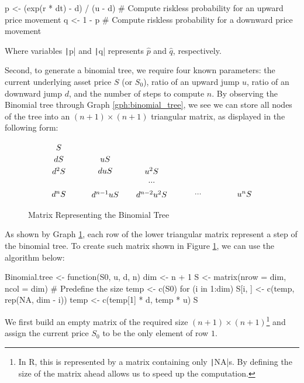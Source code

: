 \begin{Rminted}
p <- (exp(r * dt) - d) / (u - d) # Compute riskless probability for an upward price movement
q <- 1 - p # Compute riskless probability for a downward price movement
\end{Rminted}

Where variables \texttt|p| and \texttt|q| represents $\hat{p}$ and $\hat{q}$, respectively.

Second, to generate a binomial tree, we require four known parameters: the current underlying asset price $S$ (or $S_0$), ratio of an upward jump $u$, ratio of an downward jump $d$, and the number of steps to compute $n$. By observing the Binomial tree through Graph \ref{gph:binomial_tree}, we see we can store all nodes of the tree into an $(n+1)\times (n+1)$ triangular matrix, as displayed in the following form:

\begin{figure}[H]
    \centering
    \[\tikz{
        \node (a) at (0, 2) {$S$};
        \node (b) at (0, 1.5) {$dS$};
        \node (c) at (2, 1.5) {$uS$};
        \node (d) at (0, 1) {$d^2S$};
        \node (e) at (2, 1) {$duS$};
        \node (f) at (4, 1) {$u^2S$};
        \node (g) at (4, 0.5) {$...$};
        \node (h) at (0, 0) {$d^nS$};
        \node (i) at (2, 0) {$d^{n-1}uS$};
        \node (j) at (4, 0) {$d^{n-2}u^2S$};
        \node (k) at (6, 0) {$...$};
        \node (l) at (8, 0) {$u^nS$};
    }\]
    \caption{Matrix Representing the Binomial Tree} \label{gph:tree_matrix}
\end{figure}

As shown by Graph \ref{gph:tree_matrix}, each row of the lower triangular matrix represent a step of the binomial tree. To create such matrix shown in Figure \ref{gph:tree_matrix}, we can use the algorithm below:

\begin{Rminted}
Binomial.tree <- function(S0, u, d, n) {
    dim <- n + 1
    S <- matrix(nrow = dim, ncol = dim) # Predefine the size
    temp <- c(S0)
    for (i in 1:dim) {
        S[i, ] <- c(temp, rep(NA, dim - i))
        temp <- c(temp[1] * d, temp * u)
    }
    S
}
\end{Rminted}

We first build an empty matrix of the required size $(n+1)\times(n+1)$\footnote{In R, this is represented by a matrix containing only \texttt|NA|s. By defining the size of the matrix ahead allows us to speed up the computation.} and assign the current price $S_0$ to be the only element of row $1$.

